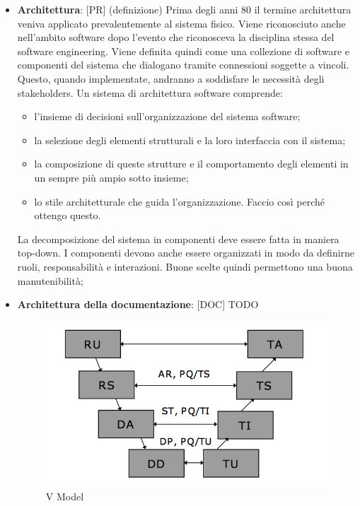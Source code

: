 \begin{itemize}
	\item \textbf{Architettura}: [PR] (definizione) Prima degli anni 80 il termine architettura veniva applicato prevalentemente al sistema fisico. Viene riconosciuto anche nell'ambito software dopo l'evento che riconosceva la disciplina stessa del software engineering. \newline
	Viene definita quindi come una collezione di software e componenti del sistema che dialogano tramite connessioni soggette a vincoli. Questo, quando implementate, andranno a soddisfare le necessità degli stakeholders. Un sistema di architettura software comprende:
		\begin{itemize}
			\item l'insieme di decisioni sull'organizzazione del sistema software;
			\item la selezione degli elementi strutturali e la loro interfaccia con il sistema;
			\item la composizione di queste strutture e il comportamento degli elementi in un sempre più ampio sotto insieme;
			\item lo stile architetturale che guida l'organizzazione. Faccio così perché ottengo questo.
		\end{itemize}
		\noindent
	La decomposizione del sistema in componenti deve essere fatta in maniera top-down. I componenti devono anche essere organizzati in modo da definirne ruoli, responsabilità e interazioni. Buone scelte quindi permettono una buona manutenibilità;

	\item \textbf{Architettura della documentazione}: [DOC] TODO
		\begin{figure}[htbp]
			\centering
			\includegraphics[scale=0.6]{img/v_model_tullio.png}
			\caption{V Model}
			\label{fig:v_model}
		\end{figure}

\end{itemize}
